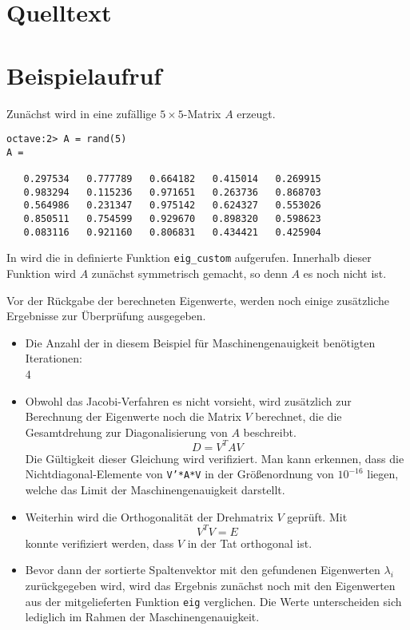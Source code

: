 \section*{Quelltext}


\section*{Beispielaufruf}
Zunächst wird in  eine zufällige $5\times 5$-Matrix $A$ erzeugt.
\begin{lstlisting}[label=lst:1]
octave:2> A = rand(5)
A =

   0.297534   0.777789   0.664182   0.415014   0.269915
   0.983294   0.115236   0.971651   0.263736   0.868703
   0.564986   0.231347   0.975142   0.624327   0.553026
   0.850511   0.754599   0.929670   0.898320   0.598623
   0.083116   0.921160   0.806831   0.434421   0.425904
\end{lstlisting}
In  wird die in  definierte Funktion
\texttt{eig\_custom} aufgerufen. Innerhalb dieser Funktion wird $A$ zunächst
symmetrisch gemacht, so denn $A$ es noch nicht ist.

Vor der Rückgabe der berechneten Eigenwerte, werden noch einige zusätzliche
Ergebnisse zur Überprüfung ausgegeben.
\begin{itemize}
 \item Die Anzahl der in diesem Beispiel für Maschinengenauigkeit benötigten Iterationen:\\
       4
 \item Obwohl das Jacobi-Verfahren es nicht vorsieht, wird zusätzlich zur Berechnung
       der Eigenwerte noch die Matrix $V$ berechnet, die die Gesamtdrehung zur
       Diagonalisierung von $A$ beschreibt.
       \[ D = V^TAV \]
       Die Gültigkeit dieser Gleichung wird verifiziert. Man kann erkennen, dass
       die Nichtdiagonal-Elemente von \texttt{V'*A*V} in der Größenordnung von
       $10^{-16}$ liegen, welche das Limit der Maschinengenauigkeit darstellt.
 \item Weiterhin wird die Orthogonalität der Drehmatrix $V$ geprüft. Mit
       \[ V^TV = E \]
       konnte verifiziert werden, dass $V$ in der Tat orthogonal ist.
 \item Bevor dann der sortierte Spaltenvektor mit den gefundenen Eigenwerten
       $λ_i$ zurückgegeben wird, wird das Ergebnis zunächst noch mit den
       Eigenwerten aus der mitgelieferten Funktion \texttt{eig} verglichen. Die
       Werte unterscheiden sich lediglich im Rahmen der Maschinengenauigkeit.
\end{itemize}

